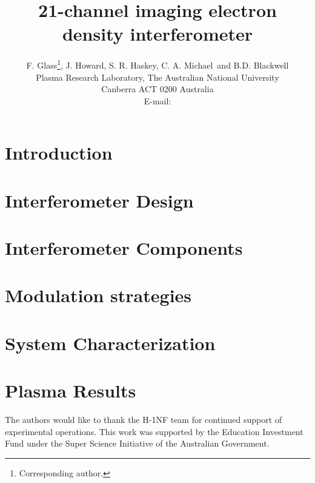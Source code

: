 \documentclass[cits]{JINST}
\title{21-channel imaging electron density interferometer}
\author{F. Glass\thanks{Corresponding
author.}, J. Howard, S. R. Haskey, C. A. Michael~and B.D. Blackwell\\
\llap{$$}Plasma Research Laboratory, The Australian National University\\
  Canberra ACT 0200 Australia\\
  E-mail: \email{fenton.glass@anu.edu.au}}
\begin{document}
\section{Introduction}


\section{Interferometer Design}

\label{sec:interferometer_design}

\section{Interferometer Components}

\label{sec:interferometer_components}

\section{Modulation strategies}

\label{sec:modulation_strategies}

\section{System Characterization}

\label{sec:system_characterization}

\section{Plasma Results}

\label{sec:plasma_results}

\acknowledgments
The authors would like to thank the H-1NF team for continued support
of experimental operations.
This work was supported by the Education Investment Fund under the
Super Science Initiative of the Australian Government.



\end{document}
